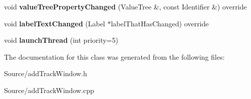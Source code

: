 \begin{DoxyCompactItemize}
\mbox{\label{classadd_track_window_a3163a27fccc3b3bd87db3cdcdb83003b}} 
void {\bfseries value\+Tree\+Property\+Changed} (Value\+Tree \&, const Identifier \&) override
\item 
\mbox{\label{classadd_track_window_a4e64f8111bf68e92c63c2b397c6f3863}} 
void {\bfseries label\+Text\+Changed} (Label $\ast$label\+That\+Has\+Changed) override
\item 
\mbox{\label{classadd_track_window_adcfc5df41382c0ec38b51799f6f33869}} 
void {\bfseries launch\+Thread} (int priority=5)
\end{DoxyCompactItemize}


The documentation for this class was generated from the following files\+:\begin{DoxyCompactItemize}
\item 
Source/add\+Track\+Window.\+h\item 
Source/add\+Track\+Window.\+cpp\end{DoxyCompactItemize}
